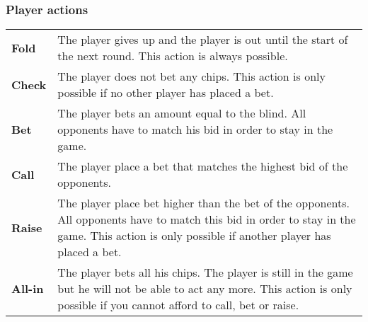 \subsubsection*{Player actions}
\begin{tabular}{ p{0.1\linewidth} p{0.9\linewidth} }
  \textbf{Fold} & The player gives up and the player is out until the start of the next round. This action is always possible.\\
  \textbf{Check} & The player does not bet any chips. This action is only possible if no other player has placed a bet.\\
  \textbf{Bet} & The player bets an amount equal to the blind. All opponents have to match his bid in order to stay in the game.\\
  \textbf{Call} & The player place a bet that matches the highest bid of the opponents.\\
  \textbf{Raise} & The player place bet higher than the bet of the opponents. All opponents have to match this bid in order to stay in the game. This action is only possible if another player has placed a bet.\\
  \textbf{All-in} & The player bets all his chips. The player is still in the game but he will not be able to act any more. This action is only possible if you cannot afford to call, bet or raise.\\
\end{tabular}